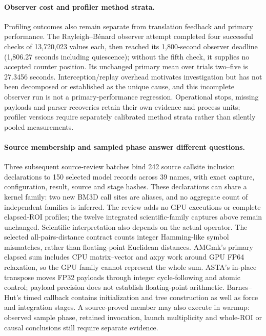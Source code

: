 \paragraph{Observer cost and profiler method strata.}
Profiling outcomes also remain separate from translation feedback and primary performance. The Rayleigh--B\'enard observer attempt completed four successful checks of 13,720,023 values each, then reached its 1,800-second observer deadline (1,806.27 seconds including quiescence); without the fifth check, it supplies no accepted counter position. Its unchanged primary mean over trials two--five is 27.3456 seconds. Interception/replay overhead motivates investigation but has not been decomposed or established as the unique cause, and this incomplete observer run is not a primary-performance regression. Operational stops, missing payloads and parser recoveries retain their own evidence and process units; profiler versions require separately calibrated method strata rather than silently pooled measurements.

\paragraph{Source membership and sampled phase answer different questions.}
Three subsequent source-review batches bind 242 source callsite inclusion declarations to 150 selected model records across 39 names, with exact capture, configuration, result, source and stage hashes. These declarations can share a kernel family: two new BM3D call sites are aliases, and no aggregate count of independent families is inferred. The review adds no GPU executions or complete elapsed-ROI profiles; the twelve integrated scientific-family captures above remain unchanged. Scientific interpretation also depends on the actual operator. The selected all-pairs-distance contract counts integer Hamming-like symbol mismatches, rather than floating-point Euclidean distances. AMGmk's primary elapsed sum includes CPU matrix--vector and axpy work around GPU FP64 relaxation, so the GPU family cannot represent the whole sum. ASTA's in-place transpose moves FP32 payloads through integer cycle-following and atomic control; payload precision does not establish floating-point arithmetic. Barnes--Hut's timed callback contains initialization and tree construction as well as force and integration stages. A source-proved member may also execute in warmup: observed sample phase, retained invocation, launch multiplicity and whole-ROI or causal conclusions still require separate evidence.

